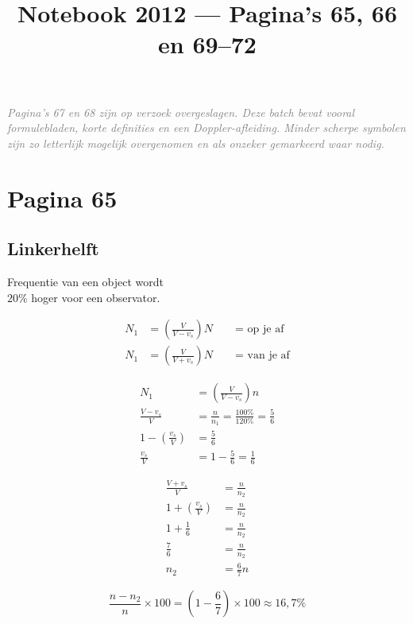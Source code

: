 \documentclass[11pt,a4paper]{article}
\title{Notebook 2012 --- Pagina's 65, 66 en 69--72}
\author{}
\date{}
\newcommand{\uncertain}[1]{\textit{\textcolor{gray}{#1}}}
\begin{document}
\maketitle

\uncertain{Pagina's 67 en 68 zijn op verzoek overgeslagen. Deze batch bevat vooral formulebladen, korte definities en een Doppler-afleiding. Minder scherpe symbolen zijn zo letterlijk mogelijk overgenomen en als onzeker gemarkeerd waar nodig.}

\clearpage
\section*{Pagina 65}

\begin{minipage}[t]{0.48\textwidth}
\subsection*{Linkerhelft}

Frequentie van een object wordt\\
$20\%$ hoger voor een observator.

\begin{center}
\end{center}

\begin{align*}
N_1 &= \left(\frac{V}{V-v_s}\right)N 
\qquad \text{= op je af}
\\[0.3em]
N_1 &= \left(\frac{V}{V+v_s}\right)N
\qquad \text{= van je af}
\end{align*}

\begin{align*}
N_1 &= \left(\frac{V}{V-v_s}\right)n
\\
\frac{V-v_s}{V} &= \frac{n}{n_1}
= \frac{100\%}{120\%}
= \frac{5}{6}
\\
1-\left(\frac{v_s}{V}\right) &= \frac{5}{6}
\\
\frac{v_s}{V} &= 1-\frac{5}{6} = \frac{1}{6}
\end{align*}

\begin{align*}
\frac{V+v_s}{V} &= \frac{n}{n_2}
\\
1+\left(\frac{v_s}{V}\right) &= \frac{n}{n_2}
\\
1+\frac{1}{6} &= \frac{n}{n_2}
\\
\frac{7}{6} &= \frac{n}{n_2}
\\
n_2 &= \frac{6}{7}n
\end{align*}

\[
\frac{n-n_2}{n}\times 100
=
\left(1-\frac{6}{7}\right)\times 100
\approx 16{,}7\%
\]
\end{minipage}
\end{document}
